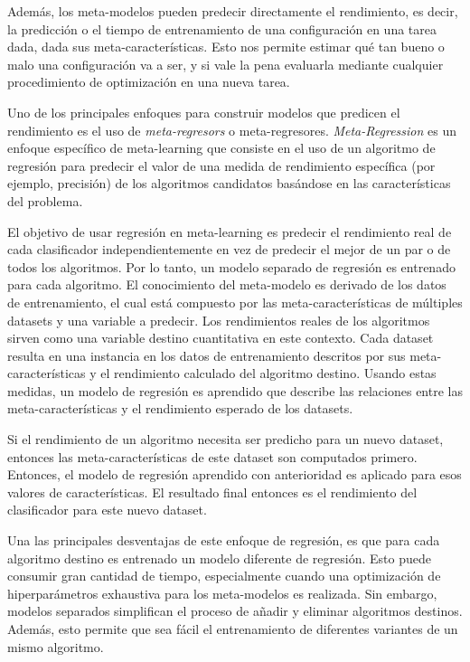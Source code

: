 \quad

Además, los meta-modelos pueden predecir directamente el rendimiento, es decir, la predicción o el tiempo de entrenamiento de una configuración en una tarea dada, dada sus meta-características. Esto nos permite estimar qué tan bueno o malo una configuración va a ser, y si vale la pena evaluarla mediante cualquier procedimiento de optimización en una nueva tarea.

Uno de los principales enfoques para construir modelos que predicen el rendimiento es el uso de \textit{meta-regresors} o meta-regresores. \textit{Meta-Regression} es un enfoque específico de meta-learning que consiste en el uso de un algoritmo de regresión para predecir el valor de una medida de rendimiento específica (por ejemplo, precisión) de los algoritmos candidatos basándose en las características del problema. 

El objetivo de usar regresión en meta-learning es predecir el rendimiento real de cada clasificador independientemente en vez de predecir el mejor de un par o de todos los algoritmos. Por lo tanto, un modelo separado de regresión es entrenado para cada algoritmo. El conocimiento del meta-modelo es derivado de los datos de entrenamiento, el cual está compuesto por las meta-características de múltiples datasets y una variable a predecir. Los rendimientos reales de los algoritmos sirven como una variable destino cuantitativa en este contexto. Cada dataset resulta en una instancia en los datos de entrenamiento descritos por sus meta-características y el rendimiento calculado del algoritmo destino. Usando estas medidas, un modelo de regresión es aprendido que describe las relaciones entre las meta-características y el rendimiento esperado de los datasets.

Si el rendimiento de un algoritmo necesita ser predicho para un nuevo dataset, entonces las meta-características de este dataset son computados primero. Entonces, el modelo de regresión aprendido con anterioridad es aplicado para esos valores de características. El resultado final entonces es el rendimiento del clasificador para este nuevo dataset.

Una las principales desventajas de este enfoque de regresión, es que para cada algoritmo destino es entrenado un modelo diferente de regresión. Esto puede consumir gran cantidad de tiempo, especialmente cuando una optimización de hiperparámetros exhaustiva para los meta-modelos es realizada. Sin embargo, modelos separados simplifican el proceso de añadir y eliminar algoritmos destinos. Además, esto permite que sea fácil el entrenamiento de diferentes variantes de un mismo algoritmo.

